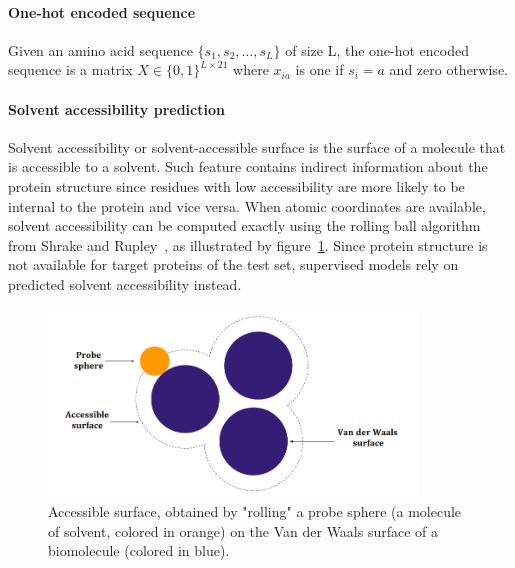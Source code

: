         \paragraph{One-hot encoded sequence}

            Given an amino acid sequence $\{s_1, s_2, \ldots,
            s_L\}$ of size L, the one-hot encoded sequence
            is a matrix $X \in \{0, 1\}^{L \times 21}$
            where $x_{ia}$ is one if $s_i = a$ and zero otherwise.

        \paragraph{Solvent accessibility prediction}

            Solvent accessibility or solvent-accessible surface is the surface of
            a molecule that is accessible to a solvent. Such feature contains indirect
            information about the protein structure since residues with low accessibility
            are more likely to be internal to the protein and vice versa.
            When atomic coordinates are available, solvent accessibility can be computed exactly
            using the rolling ball algorithm from Shrake and Rupley~\cite{shrake1973environment},
            as illustrated by figure~\ref{rollingball}.
            Since protein structure is not available for target proteins of the test set,
            supervised models rely on predicted solvent accessibility instead.

            \begin{figure}[H]
                \begin{center}
                    \includegraphics[height=5cm, keepaspectratio]{imgs/accessibility.png}
                    \caption{Accessible surface, obtained by "rolling" a probe sphere (a molecule
                        of solvent, colored in orange) on the Van der Waals surface of a biomolecule
                        (colored in blue).}
                    \label{rollingball}
                \end{center}
            \end{figure}

